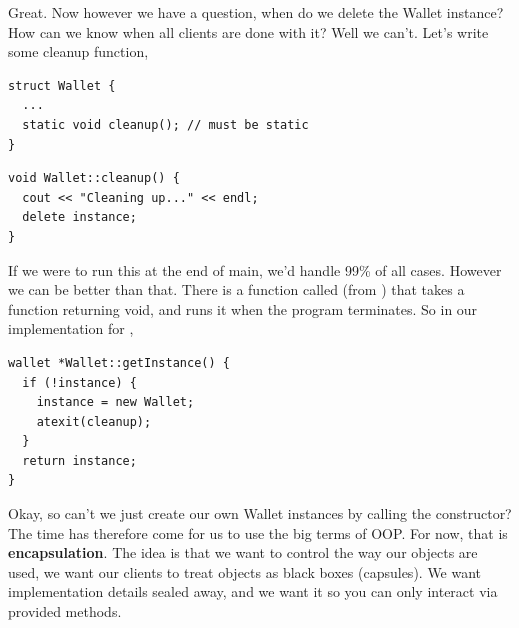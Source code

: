 \documentclass[english, 11pt]{article}
\begin{document}
\begin{exmp}
Great. Now however we have a question, when do we delete the Wallet instance? How can we know when all clients are done with it? Well we can't. Let's write some cleanup function,
\begin{lstlisting}[title=.h]
struct Wallet {
  ...
  static void cleanup(); // must be static
}
\end{lstlisting}
\begin{lstlisting}[title=.cc]
void Wallet::cleanup() {
  cout << "Cleaning up..." << endl;
  delete instance;
}
\end{lstlisting}
If we were to run this at the end of main, we'd handle 99\% of all cases. However we can be better than that. There is a function called  (from ) that takes a function returning void, and runs it when the program terminates. So in our implementation for ,
\begin{lstlisting}
wallet *Wallet::getInstance() {
  if (!instance) {
    instance = new Wallet;
    atexit(cleanup);
  }
  return instance;
}
\end{lstlisting}
\end{exmp}
Okay, so can't we just create our own Wallet instances by calling the constructor? The time has therefore come for us to use the big terms of OOP. For now, that is \textbf{encapsulation}. The idea is that we want to control the way our objects are used, we want our clients to treat objects as black boxes (capsules). We want implementation details sealed away, and we want it so you can only interact via provided methods.
\end{document}

